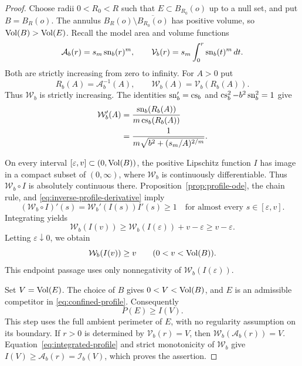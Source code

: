 \begin{proof}
Choose radii $0<R_0<R$ such that $E\subset B_{R_0}(o)$ up to a
null set, and put $B=B_R(o)$. The annulus
$B_R(o)\setminus\overline{B_{R_0}(o)}$ has positive volume, so
$\operatorname{Vol}(B)>\operatorname{Vol}(E)$.  Recall the model area and volume functions
\[
 \mathcal A_b(r)=s_m\operatorname{sn}_b(r)^m,
 \qquad
 \mathcal V_b(r)=s_m\int_0^r\operatorname{sn}_b(t)^m\,dt.
\]
Both are strictly increasing from zero to infinity.  For $A>0$ put
\begin{equation}
\label{eq:inverse-model-profile}
 R_b(A)=\mathcal A_b^{-1}(A),
 \qquad
 \mathcal W_b(A)=\mathcal V_b(R_b(A)).
\end{equation}
Thus $\mathcal W_b$ is strictly increasing.  The identities
$\operatorname{sn}_b'=\operatorname{cs}_b$ and $\operatorname{cs}_b^2-b^2\operatorname{sn}_b^2=1$ give
\begin{equation}
\label{eq:inverse-profile-derivative}
 \begin{split}
 \mathcal W_b'(A)
 &=\frac{\operatorname{sn}_b(R_b(A))}{m\operatorname{cs}_b(R_b(A))}\\
 &=\frac{1}{m\sqrt{b^2+(s_m/A)^{2/m}}}.
 \end{split}
\end{equation}

On every interval $[\varepsilon,v]\subset(0,\operatorname{Vol}(B))$, the
positive Lipschitz function $I$ has image in a compact subset of
$(0,\infty)$, where $\mathcal W_b$ is continuously differentiable.
Thus $\mathcal W_b\circ I$ is absolutely continuous there.
Proposition~\ref{prop:profile-ode}, the chain rule, and
\eqref{eq:inverse-profile-derivative} imply
\[
 (\mathcal W_b\circ I)'(s)
 =\mathcal W_b'(I(s))I'(s)\ge1
 \quad\text{for almost every }s\in[\varepsilon,v].
\]
Integrating yields
\[
 \mathcal W_b(I(v))
 \ge\mathcal W_b(I(\varepsilon))+v-\varepsilon
 \ge v-\varepsilon.
\]
Letting $\varepsilon\downarrow0$, we obtain
\begin{equation}
\label{eq:integrated-profile}
 \mathcal W_b(I(v))\ge v
 \qquad(0<v<\operatorname{Vol}(B)).
\end{equation}
This endpoint passage uses only nonnegativity of
$\mathcal W_b(I(\varepsilon))$.

Set $V=\operatorname{Vol}(E)$. The choice of $B$ gives $0<V<\operatorname{Vol}(B)$, and $E$
is an admissible competitor in \eqref{eq:confined-profile}. Consequently
\[
 P(E)\ge I(V).
\]
This step uses the full ambient perimeter of $E$, with no regularity
assumption on its boundary.
If $r>0$ is determined by $\mathcal V_b(r)=V$, then
$\mathcal W_b(\mathcal A_b(r))=V$.
Equation~\eqref{eq:integrated-profile} and strict monotonicity of
$\mathcal W_b$ give $I(V)\ge\mathcal A_b(r)=\mathcal I_b(V)$,
which proves the assertion.
\end{proof}

